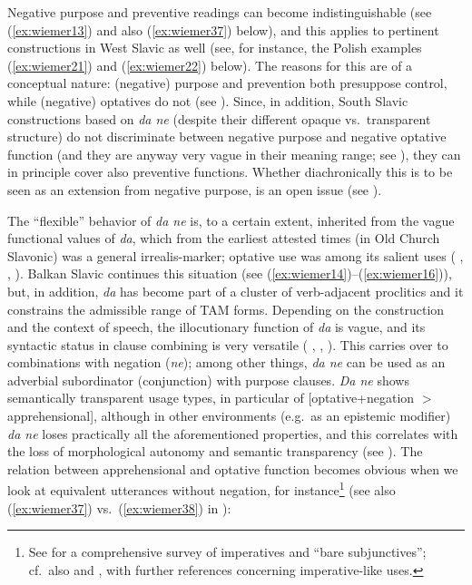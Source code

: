 \documentclass[output=paper,colorlinks,citecolor=brown]{langscibook}
\begin{document}
Negative purpose and preventive readings can become indistinguishable (see (\ref{ex:wiemer13}) and also (\ref{ex:wiemer37}) below), and this applies to pertinent constructions in West Slavic as well (see, for instance, the Polish examples (\ref{ex:wiemer21}) and (\ref{ex:wiemer22}) below). The reasons for this are of a conceptual nature: (negative) purpose and prevention both presuppose control, while (negative) optatives do not (see ). Since, in addition, South Slavic constructions based on \textit{da ne} (despite their different opaque vs.\ transparent structure) do not discriminate between negative purpose and negative optative function (and they are anyway very vague in their meaning range; see ), they can in principle cover also preventive functions. Whether diachronically this is to be seen as an extension from negative purpose, is an open issue (see ).


The ``flexible'' behavior of \textit{da ne} is, to a certain extent, inherited from the vague functional values of \textit{da}, which from the earliest attested times (in Old Church Slavonic) was a general irrealis-marker; optative use was among its salient uses (\citeauthor{Večerka1993} \citeyear[79]{Večerka1993}, \citeyear[65]{Večerka1996}, \citealt{Grković-Major2020}). Balkan Slavic continues this situation (see (\ref{ex:wiemer14})--(\ref{ex:wiemer16})), but, in addition, \textit{da} has become part of a cluster of verb-adjacent proclitics and it constrains the admissible range of TAM forms. Depending on the construction and the context of speech, the illocutionary function of \textit{da} is vague, and its syntactic status in clause combining is very versatile (\citeauthor{Wiemer2017} \citeyear[300--305, 325--330]{Wiemer2017}, \citeyear[295--306]{Wiemer2018}, \citeyear[58--80]{Wiemer2021}). This carries over to combinations with negation (\textit{ne}); among other things, \textit{da ne} can be used as an adverbial subordinator (conjunction) with purpose clauses. \textit{Da ne} shows semantically transparent usage types, in particular of [optative+negation $>$ apprehensional], although in other environments (e.g.\ as an epistemic modifier) \textit{da ne} loses practically all the aforementioned properties, and this correlates with the loss of morphological autonomy and semantic transparency (see ). The relation between apprehensional and optative function becomes obvious when we look at equivalent utterances without negation, for instance\footnote{See \citet{Tomić2012} for a comprehensive survey of imperatives and ``bare subjunctives''; cf.\ also \citet{Mitkovska2015} and \citet{MitkovskaEtAl2017}, with further references concerning imperative-like uses.} (see also (\ref{ex:wiemer37}) vs.\ (\ref{ex:wiemer38}) in ):
\end{document}
